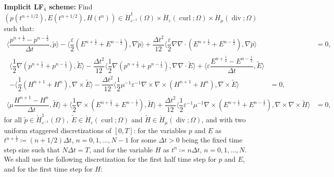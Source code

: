 \documentclass{amsart}
\theoremstyle{thmstyleone}%
\theoremstyle{thmstyletwo}%
\theoremstyle{thmstylethree}%
\DeclareMathOperator{\curl}{curl}
\def\divgn{\operatorname{div}}
\newcommand{\aInnerproduct}[2]{\bigl\langle #1, #2 \bigr\rangle}
\begin{document}
\smallskip \noindent \textbf{Implicit LF$_4$ scheme:} Find $(p(t^{n + 1/2}), E(t^{n + 1/2}), H(t^n)) \in \mathring{H}^1_{\varepsilon^{-1}}(\Omega) \times \mathring{H}_{\varepsilon}(\curl; \Omega) \times \mathring{H}_{\mu}(\divgn; \Omega)$ such that:
\begin{subequations}
\begin{align}
  \aInnerproduct{\dfrac{p^{n + \frac{1}{2}} - p^{n - \frac{1}{2}}}{\Delta t}}{\widetilde{p}} - \aInnerproduct{\dfrac{\varepsilon}{2} \left( E^{n + \frac{1}{2}} + E^{n - \frac{1}{2}} \right)}{\nabla \widetilde{p}} + \dfrac{\Delta t^2}{12} \aInnerproduct{\dfrac{\varepsilon}{2} \nabla \nabla \cdot \left( E^{n + \frac{1}{2}} + E^{n - \frac{1}{2}} \right)}{\nabla \widetilde{p}} &=0, \label{eqn:maxwell_p_lf4} \\
  \begin{split}
   \aInnerproduct{\dfrac{1}{2} \nabla \left(p^{n + \frac{1}{2}} + p^{n - \frac{1}{2}} \right)}{\widetilde{E}} - \dfrac{\Delta t^2}{12} \aInnerproduct{\dfrac{1}{2} \nabla \left(p^{n + \frac{1}{2}} + p^{n - \frac{1}{2}} \right)}{\nabla \nabla \cdot \widetilde{E}} + \aInnerproduct{\varepsilon \dfrac{E^{n + \frac{1}{2}} - E^{n - \frac{1}{2}}}{\Delta t}}{\widetilde{E}} \\ - \aInnerproduct{\dfrac{1}{2} \left( H^{n + 1} + H^n \right)}{\nabla \times \widetilde{E}}  - \dfrac{\Delta t^2}{12} \aInnerproduct{\dfrac{1}{2} \mu^{-1}\varepsilon^{-1} \nabla \times \nabla \times \left( H^{n + 1} + H^n \right)}{\nabla \times \widetilde{E}} &= 0, \label{eqn:maxwell_E_lf4} 
     \end{split} \\
  \aInnerproduct{\mu \dfrac{H^{n + 1} - H^n}{\Delta t}}{\widetilde{H}} +  \aInnerproduct{\dfrac{1}{2} \nabla \times \left( E^{n + \frac{1}{2}} + E^{n - \frac{1}{2}} \right)}{\widetilde{H}} +  \dfrac{\Delta t^2}{12} \aInnerproduct{\dfrac{1}{2} \varepsilon^{-1}\mu^{-1} \nabla \times \left( E^{n + \frac{1}{2}} + E^{n - \frac{1}{2}} \right)}{\nabla \times  \nabla \times \widetilde{H}} &= 0, \label{eqn:maxwell_H_lf4}
\end{align}
\end{subequations}
for all $\widetilde{p} \in \mathring{H}^1_{\varepsilon^{-1}}(\Omega), \; \widetilde{E} \in \mathring{H}_{\varepsilon}(\curl; \Omega)$ and $\widetilde{H} \in \mathring{H}_{\mu}(\divgn; \Omega)$, and with two uniform staggered discretizations of $[0, T]$: for the variables $p$ and $E$ as $t^{n + \frac{1}{2}} \coloneq (n + 1/2) \Delta t$, $n = 0, 1, \dots, N - 1$ for some $\Delta t > 0$ being the fixed time step size such that $N \Delta t = T$, and for the variable $H$ as $t^n \coloneq n \Delta t$, $n = 0, 1, \dots, N$. We shall use the following discretization for the first half time step for $p$ and $E$, and for the first time step for $H$:
\end{document}
